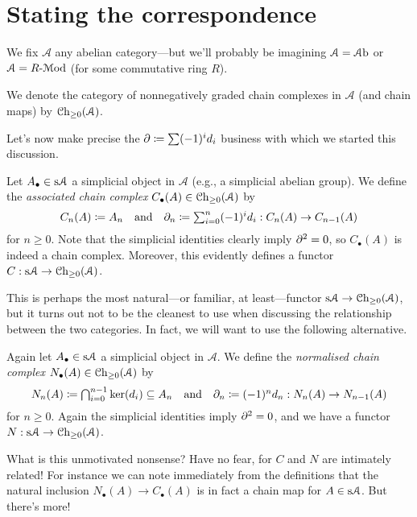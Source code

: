 
\renewcommand{\A}{\mathcal{A}}

\section{Stating the correspondence}

We fix $\A$ any abelian category---but we'll probably be imagining $\A
= \Ab$ or $\A = R\text{-}\Mod$ (for some commutative ring $R$).

\begin{notation}
  We denote the category of nonnegatively graded chain complexes in
  $\A$ (and chain maps) by $\Ch_{\ge 0}(\A)$.
\end{notation}

Let's now make precise the $\partial \coloneqq \sum (-1)^i d_i$ business
with which we started this discussion.

\begin{definition}
  Let $A_\bullet \in \s\A$ a simplicial object in $\A$ (e.g., a
  simplicial abelian group). We define the \textit{associated chain
    complex} $C_\bullet(A) \in \Ch_{\ge 0}(\A)$ by
  \[
  \textstyle{C_n(A) \coloneqq A_n \quad\text{and}\quad \partial_n
    \coloneqq \sum_{i=0}^n (-1)^i d_i : C_n(A) \to C_{n-1}(A)}
  \]
  for $n \ge 0$. Note that the simplicial identities clearly imply
  $\partial^2 = 0$, so $C_\bullet(A)$ is indeed a chain complex. Moreover,
  this evidently defines a functor $C : \s\A \to \Ch_{\ge 0}(\A)$.
\end{definition}

This is perhaps the most natural---or familiar, at least---functor
$\s\A \to \Ch_{\ge 0}(\A)$, but it turns out not to be the cleanest to
use when discussing the relationship between the two categories. In
fact, we will want to use the following alternative.

\begin{definition}
  Again let $A_\bullet \in \s\A$ a simplicial object in $\A$. We
  define the \textit{normalised chain complex} $N_\bullet(A) \in
  \Ch_{\ge 0}(\A)$ by
  \[
  \textstyle{N_n(A) \coloneqq \bigcap_{i=0}^{n-1} \ker(d_i) \subseteq
    A_n \quad\text{and}\quad \partial_n \coloneqq (-1)^n d_n : N_n(A) \to
    N_{n-1}(A)}
  \]
  for $n \ge 0$. Again the simplicial identities imply $\partial^2 = 0$,
  and we have a functor $N : \s\A \to \Ch_{\ge 0}(\A)$.
\end{definition}

What is this unmotivated nonsense? Have no fear, for $C$ and $N$ are
intimately related! For instance we can note immediately from the
definitions that the natural inclusion $N_\bullet(A) \to C_\bullet(A)$
is in fact a chain map for $A \in \s\A$. But there's more!


